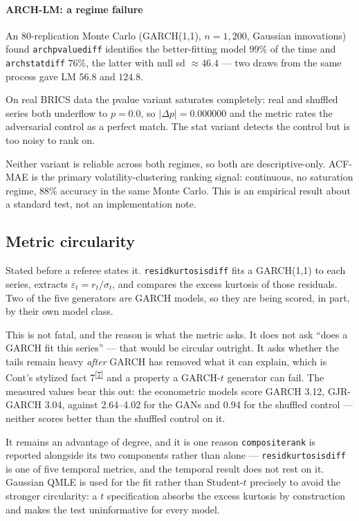 \documentclass[11pt,a4paper]{article}
\makeatletter
\newcommand{\tcite}[1]{\textsuperscript{[\hyperlink{R:#1}{#1}]}}
\DeclareRobustCommand{\_}{\ifmmode\nfss@text{\textunderscore}\else\textunderscore\allowbreak\fi}
\makeatother
\begin{document}
\paragraph{ARCH-LM: a regime failure} An 80-replication Monte Carlo (GARCH(1,1), $n=1{,}200$, Gaussian innovations) found \texttt{arch\_pvalue\_diff} identifies the better-fitting model $99\%$ of the time and \texttt{arch\_stat\_diff} $76\%$, the latter with null sd $\approx46.4$ --- two draws from the same process gave LM $56.8$ and $124.8$.

On real BRICS data the pvalue variant saturates completely: real and shuffled series both underflow to $p=0.0$, so $|\Delta p| = 0.000000$ and the metric rates the adversarial control as a perfect match. The stat variant detects the control but is too noisy to rank on.

Neither variant is reliable across both regimes, so both are descriptive-only. ACF-MAE is the primary volatility-clustering ranking signal: continuous, no saturation regime, $88\%$ accuracy in the same Monte Carlo. This is an empirical result about a standard test, not an implementation note.

\subsection{Metric circularity}
\label{sec:circularity}
Stated before a referee states it. \texttt{resid\_kurtosis\_diff} fits a GARCH(1,1) to each series, extracts $\varepsilon_t = r_t/\sigma_t$, and compares the excess kurtosis of those residuals. Two of the five generators \emph{are} GARCH models, so they are being scored, in part, by their own model class.

This is not fatal, and the reason is what the metric asks. It does not ask ``does a GARCH fit this series'' --- that would be circular outright. It asks whether the tails remain heavy \emph{after} GARCH has removed what it can explain, which is Cont's stylized fact 7\tcite{7} and a property a GARCH-$t$ generator can fail. The measured values bear this out: the econometric models score GARCH 3.12, GJR-GARCH 3.04, against 2.64--4.02 for the GANs and 0.94 for the shuffled control --- neither scores better than the shuffled control on it.

It remains an advantage of degree, and it is one reason \texttt{composite\_rank} is reported alongside its two components rather than alone --- \texttt{resid\_kurtosis\_diff} is one of five temporal metrics, and the temporal result does not rest on it. Gaussian QMLE is used for the fit rather than Student-$t$ precisely to avoid the stronger circularity: a $t$ specification absorbs the excess kurtosis by construction and makes the test uninformative for every model.
\end{document}
